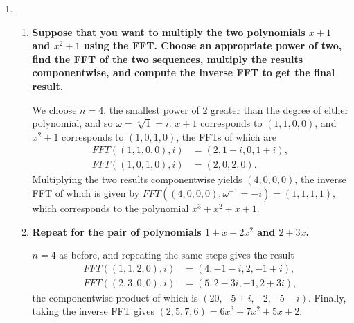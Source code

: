 \documentclass[a4paper,12pt]{article}
\begin{document}
\begin{enumerate}
    \item
        \begin{enumerate}
            \item
                \boldmath\textbf{Suppose that you want to multiply the two polynomials $x + 1$ and $x^2 + 1$ using the FFT. Choose an appropriate power of two, find the FFT of the two sequences, multiply the results componentwise, and compute the inverse FFT to get the final result.
                }\unboldmath \par
                We choose $n = 4$, the smallest power of $2$ greater than the degree of either polynomial, and so $\omega = \sqrt[4]{1} = i$. $x + 1$ corresponds to $(1, 1, 0, 0)$, and $x^2 + 1$ corresponds to $(1, 0, 1, 0)$, the FFTs of which are
                \begin{align*}
                    FFT((1, 1, 0, 0), i) &= (2, 1 - i, 0, 1 + i), \\
                    FFT((1, 0, 1, 0), i) &= (2, 0, 2, 0).
                \end{align*}
                Multiplying the two results componentwise yields $(4, 0, 0, 0)$, the inverse FFT of which is given by $FFT((4, 0, 0, 0), \omega^{-1} = -i) = (1, 1, 1, 1)$, which corresponds to the polynomial $x^3 + x^2 + x + 1$.
            \item
                \boldmath\textbf{Repeat for the pair of polynomials $1 + x + 2x^2$ and $2 + 3x$.
                }\unboldmath \par
                $n = 4$ as before, and repeating the same steps gives the result
                \begin{align*}
                    FFT((1, 1, 2, 0), i) &= (4, -1 - i, 2, -1 + i), \\
                    FFT((2, 3, 0, 0), i) &= (5, 2 - 3i, -1, 2 + 3i),
                \end{align*}
                the componentwise product of which is $(20, -5 + i, -2, -5 - i)$. Finally, taking the inverse FFT gives $(2, 5, 7, 6) = 6x^3 + 7x^2 + 5x + 2$.
        \end{enumerate}


\end{enumerate}
\end{document}
